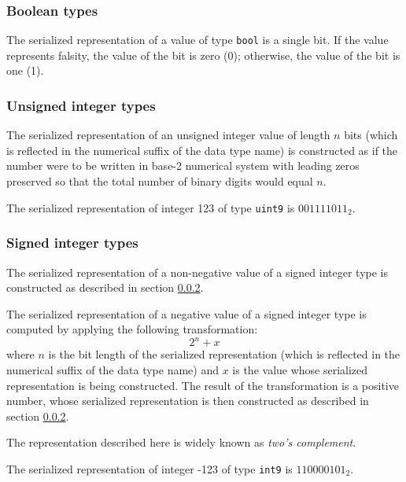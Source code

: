 \subsubsection{Boolean types}\label{sec:dsdl_serialized_bool}

The serialized representation of a value of type \verb|bool| is a single bit.
If the value represents falsity, the value of the bit is zero (0); otherwise, the value of the bit is one (1).

\subsubsection{Unsigned integer types}\label{sec:dsdl_serialized_unsigned_integer}

The serialized representation of an unsigned integer value of length $n$ bits
(which is reflected in the numerical suffix of the data type name)
is constructed as if the number were to be written in base-2 numerical system
with leading zeros preserved so that the total number of binary digits would equal $n$.

\begin{remark}
    The serialized representation of integer 123 of type \verb|uint9| is $001111011_2$.
\end{remark}

\subsubsection{Signed integer types}

The serialized representation of a non-negative value of a signed integer type is constructed as described
in section \ref{sec:dsdl_serialized_unsigned_integer}.

The serialized representation of a negative value of a signed integer type is computed by
applying the following transformation:
$$2^n + x$$
where $n$ is the bit length of the serialized representation
(which is reflected in the numerical suffix of the data type name)
and $x$ is the value whose serialized representation is being constructed.
The result of the transformation is a positive number,
whose serialized representation is then constructed as described in section \ref{sec:dsdl_serialized_unsigned_integer}.

The representation described here is widely known as \emph{two's complement}.

\begin{remark}
    The serialized representation of integer -123 of type \verb|int9| is $110000101_2$.
\end{remark}

